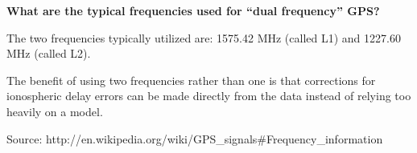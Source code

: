 \textbf{What are the typical frequencies used for ``dual frequency''
GPS?}

The two frequencies typically utilized are:
1575.42 MHz (called L1) and 1227.60 MHz (called L2). 

The benefit of using two frequencies rather than one is that corrections
for ionospheric delay errors can be made directly from the data instead
of relying too heavily on a model.

Source: http://en.wikipedia.org/wiki/GPS\_signals\#Frequency\_information


